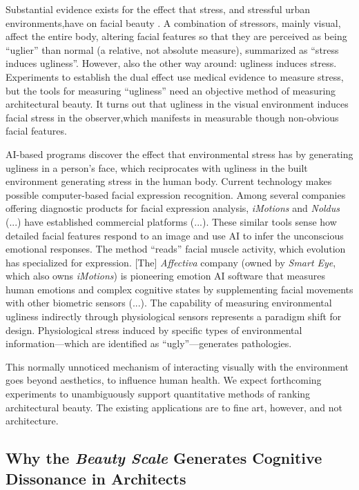 \documentclass[a4paper]{article}
\begin{document}
Substantial evidence exists for the effect that stress, and stressful urban environments,have on facial beauty \cite{moore_evidence_2011}. A combination of stressors, mainly visual, affect the entire body, altering facial features so that they are perceived as being “uglier” than normal (a relative, not absolute measure), summarized as “stress induces ugliness”. However, also the other way around: ugliness induces stress. Experiments to establish the dual effect use medical evidence to measure stress, but the tools for measuring “ugliness” need an objective method of measuring architectural beauty. It turns out that ugliness in the visual environment induces facial stress in the observer,which manifests in measurable though non-obvious facial features.

AI-based programs discover the effect that environmental stress has by generating ugliness in a person’s face, which reciprocates with ugliness in the built environment generating stress in the human body. Current technology makes possible computer-based facial expression recognition. Among several companies offering diagnostic products for facial expression analysis, \textit{iMotions} and \textit{Noldus} (...) have established commercial platforms (...). These similar tools sense how detailed facial features respond to an image and use AI to infer the unconscious emotional responses. The method “reads” facial muscle activity, which evolution has specialized for expression. [The] \textit{Affectiva} company (owned by \textit{Smart Eye}, which also owns \textit{iMotions}) is pioneering emotion AI software that measures human emotions and complex cognitive states by supplementing facial movements with other biometric sensors (...). The capability of measuring environmental ugliness indirectly through physiological sensors represents a paradigm shift for design. Physiological stress induced by specific types of environmental information—which are identified as “ugly”—generates pathologies.

This normally unnoticed mechanism of interacting visually with the environment goes beyond aesthetics, to influence human health. We expect forthcoming experiments to unambiguously support quantitative methods of ranking architectural beauty. The existing applications are to fine art, however, and not architecture.

\subsection{Why the \textit{Beauty Scale} Generates Cognitive Dissonance in Architects}
\end{document}
